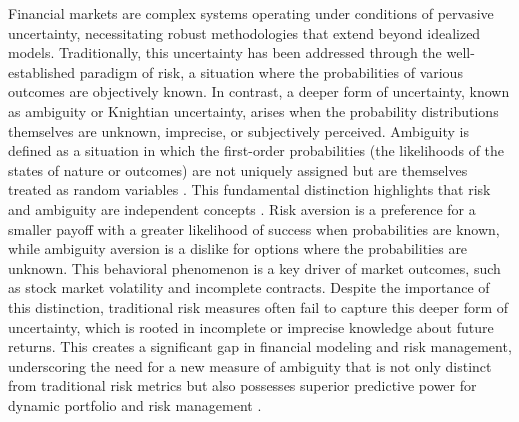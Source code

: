\documentclass[preprint,12pt,authoryear]{elsarticle}
\begin{document}

Financial markets are complex systems operating under conditions of pervasive uncertainty, necessitating robust methodologies that extend beyond idealized models. Traditionally, this uncertainty has been addressed through the well-established paradigm of risk, a situation where the probabilities of various outcomes are objectively known. In contrast, a deeper form of uncertainty, known as ambiguity \cite{knight1921} or Knightian uncertainty, arises when the probability distributions themselves are unknown, imprecise, or subjectively perceived. Ambiguity is defined as a situation in which the first-order probabilities (the likelihoods of the states of nature or outcomes) are not uniquely assigned but are themselves treated as random variables \cite{ellsberg1961}. This fundamental distinction highlights that risk and ambiguity are independent concepts \cite{klibanoff2005}. Risk aversion is a preference for a smaller payoff with a greater likelihood of success when probabilities are known, while ambiguity aversion is a dislike for options where the probabilities are unknown. This behavioral phenomenon is a key driver of market outcomes, such as stock market volatility and incomplete contracts. Despite the importance of this distinction, traditional risk measures often fail to capture this deeper form of uncertainty, which is rooted in incomplete or imprecise knowledge about future returns. This creates a significant gap in financial modeling and risk management, underscoring the need for a new measure of ambiguity that is not only distinct from traditional risk metrics but also possesses superior predictive power for dynamic portfolio and risk management \citep{Bollerslev1988}.

\end{document}
